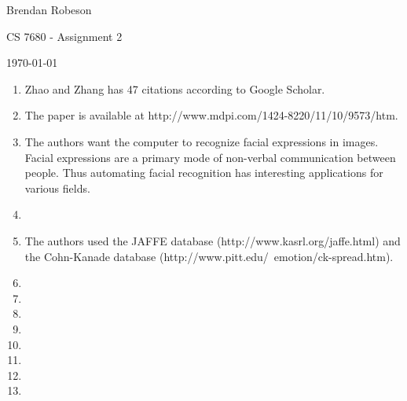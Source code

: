 \documentclass[11pt]{article}
\begin{document}
\noindent Brendan Robeson

\noindent CS 7680 - Assignment 2

\noindent \today

\medskip

\begin{enumerate}
    \item Zhao and Zhang \cite{s111009573} has 47 citations according to Google
        Scholar.

    \item The paper is available at
        http://www.mdpi.com/1424-8220/11/10/9573/htm.

    \item The authors want the computer to recognize facial expressions in images. Facial expressions are a primary mode of non-verbal communication between people. Thus automating facial recognition has interesting applications for various fields.

    \item 
    \item The authors used the JAFFE database (http://www.kasrl.org/jaffe.html) and the Cohn-Kanade database (http://www.pitt.edu/~emotion/ck-spread.htm).

    \item 
    \item 
    \item 
    \item 
    \item 
    \item 
    \item 
    \item 
\end{enumerate}



\end{document}
